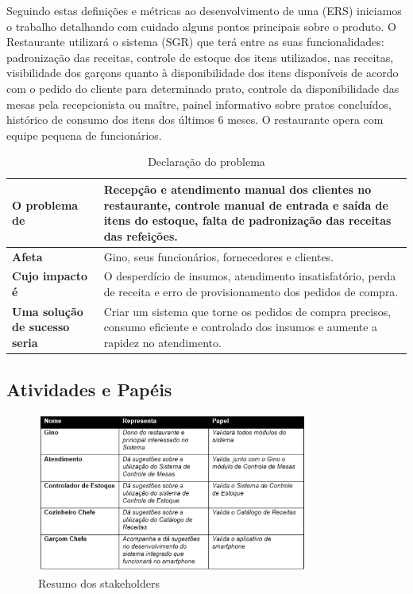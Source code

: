 Seguindo estas definições e métricas ao desenvolvimento de uma (ERS) iniciamos o trabalho detalhando com cuidado alguns pontos principais sobre o produto. O Restaurante utilizará o sistema (SGR) que terá entre as suas funcionalidades: padronização das receitas, controle de estoque dos itens utilizados, nas receitas, visibilidade dos garçons quanto à disponibilidade dos itens disponíveis de acordo com o pedido do cliente para determinado prato, controle da disponibilidade das mesas pela recepcionista ou maître, painel informativo sobre pratos concluídos, histórico de consumo dos itens dos últimos 6 meses. O restaurante opera com equipe pequena de funcionários.


\begin{table}[htb]
      \begin{center}
        \begin{tabular}{| p{6cm} | p{6cm} |}
        \hline
        \textbf{O problema de} & Recepção e atendimento manual dos clientes no restaurante, controle manual de entrada e saída de itens do estoque, falta de padronização das receitas das refeições.  \\ \hline
        \textbf{Afeta} & Gino, seus funcionários, fornecedores e clientes. \\ \hline
        \textbf{Cujo impacto é} & O desperdício de insumos, atendimento insatisfatório, perda de receita e erro de provisionamento dos pedidos de compra. \\ \hline
        \textbf{Uma solução de sucesso seria} & Criar um sistema que torne os pedidos de compra precisos, consumo eficiente e controlado dos insumos e aumente a rapidez no atendimento. \\ \hline
        
        \end{tabular}
      \end{center}
    \caption{Declaração do problema}
    \end{table}


\subsection{Atividades e Papéis}

\begin{figure}[H]
  \centering
  \includegraphics[width=0.8\textwidth]{softwareengineer/images/stakeholders} 
  \caption{Resumo dos stakeholders}
  \label{fig:stakeholders} 
\end{figure}

